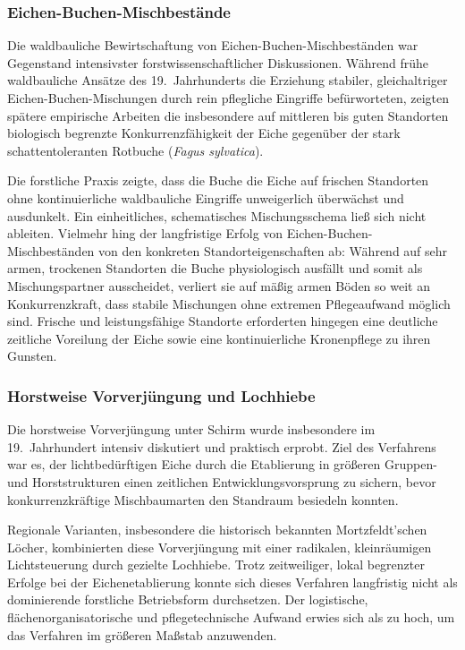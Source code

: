\documentclass[twocolumn, bibliography=totoc, abstract=true]{scrartcl}
\begin{document}
\subsubsection{Eichen-Buchen-Mischbestände}

Die waldbauliche Bewirtschaftung von Eichen-Buchen-Mischbeständen war Gegenstand intensivster forstwissenschaftlicher Diskussionen. Während frühe waldbauliche Ansätze des 19.~Jahrhunderts die Erziehung stabiler, gleichaltriger Eichen-Buchen-Mischungen durch rein pflegliche Eingriffe befürworteten, zeigten spätere empirische Arbeiten die insbesondere auf mittleren bis guten Standorten biologisch begrenzte Konkurrenzfähigkeit der Eiche gegenüber der stark schattentoleranten Rotbuche (\textit{Fagus sylvatica}).

Die forstliche Praxis zeigte, dass die Buche die Eiche auf frischen Standorten ohne kontinuierliche waldbauliche Eingriffe unweigerlich überwächst und ausdunkelt. Ein einheitliches, schematisches Mischungsschema ließ sich nicht ableiten. Vielmehr hing der langfristige Erfolg von Eichen-Buchen-Mischbeständen von den konkreten Standorteigenschaften ab: Während auf sehr armen, trockenen Standorten die Buche physiologisch ausfällt und somit als Mischungspartner ausscheidet, verliert sie auf mäßig armen Böden so weit an Konkurrenzkraft, dass stabile Mischungen ohne extremen Pflegeaufwand möglich sind. Frische und leistungsfähige Standorte erforderten hingegen eine deutliche zeitliche Voreilung der Eiche sowie eine kontinuierliche Kronenpflege zu ihren Gunsten.

\subsubsection{Horstweise Vorverjüngung und Lochhiebe}

Die horstweise Vorverjüngung unter Schirm wurde insbesondere im 19.~Jahrhundert intensiv diskutiert und praktisch erprobt. Ziel des Verfahrens war es, der lichtbedürftigen Eiche durch die Etablierung in größeren Gruppen- und Horststrukturen einen zeitlichen Entwicklungsvorsprung zu sichern, bevor konkurrenzkräftige Mischbaumarten den Standraum besiedeln konnten.

Regionale Varianten, insbesondere die historisch bekannten Mortzfeldt’schen Löcher, kombinierten diese Vorverjüngung mit einer radikalen, kleinräumigen Lichtsteuerung durch gezielte Lochhiebe. Trotz zeitweiliger, lokal begrenzter Erfolge bei der Eichenetablierung konnte sich dieses Verfahren langfristig nicht als dominierende forstliche Betriebsform durchsetzen. Der logistische, flächenorganisatorische und pflegetechnische Aufwand erwies sich als zu hoch, um das Verfahren im größeren Maßstab anzuwenden.
\end{document}
